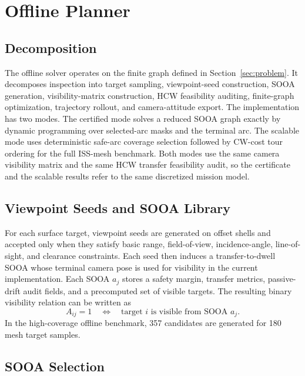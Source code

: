 \section{Offline Planner}
\label{sec:algorithm}

\subsection{Decomposition}

The offline solver operates on the finite graph defined in
Section~\ref{sec:problem}. It decomposes inspection into target sampling,
viewpoint-seed construction, SOOA generation, visibility-matrix construction,
HCW feasibility auditing, finite-graph optimization, trajectory rollout, and
camera-attitude export. The implementation has two modes. The certified mode
solves a reduced SOOA graph exactly by dynamic programming over selected-arc
masks and the terminal arc. The scalable mode uses deterministic safe-arc
coverage selection followed by CW-cost tour ordering for the full ISS-mesh
benchmark. Both modes use the same camera visibility matrix and the same HCW
transfer feasibility audit, so the certificate and the scalable results refer
to the same discretized mission model.

\subsection{Viewpoint Seeds and SOOA Library}

For each surface target, viewpoint seeds are generated on offset shells and
accepted only when they satisfy basic range, field-of-view, incidence-angle,
line-of-sight, and clearance constraints. Each seed then induces a
transfer-to-dwell SOOA whose terminal camera pose is used for visibility in
the current implementation. Each SOOA $a_j$ stores a safety margin, transfer
metrics, passive-drift audit fields, and a precomputed set of visible targets.
The resulting binary
visibility relation can be written as
\begin{equation}
  A_{ij}=1
  \quad \Longleftrightarrow \quad
  \text{target } i \text{ is visible from SOOA } a_j .
\end{equation}
In the high-coverage offline benchmark, 357 candidates are generated for
180 mesh target samples.

\subsection{SOOA Selection}

